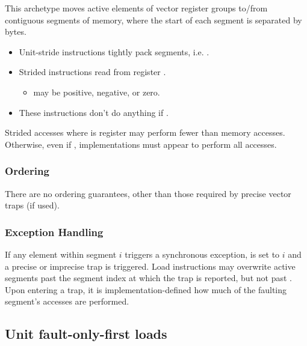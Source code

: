 \noindent
This archetype moves active elements of  vector register groups to/from contiguous segments of memory,
where the start of each segment is separated by  bytes.

\begin{itemize}
    \item Unit-stride instructions tightly pack segments, i.e. .
    \item Strided instructions read  from register .
    \begin{itemize}
        \item {} may be positive, negative, or zero.
    \end{itemize}
    \item These instructions don't do anything if .
\end{itemize}

Strided accesses where  is register  may perform fewer than  memory accesses.
Otherwise, even if , implementations must appear to perform all accesses.

\subsubsection*{Ordering}
There are no ordering guarantees, other than those required by precise vector traps (if used).

\subsubsection*{Exception Handling}
If any element within segment $i$ triggers a synchronous exception,  is set to $i$ and a precise or imprecise trap is triggered.
Load instructions may overwrite active segments past the segment index at which the trap is reported, but not past .\cite[Section~7.7]{specification-RVV-v1.0}
Upon entering a trap, it is implementation-defined how much of the faulting segment's accesses are performed.

\subsection{Unit fault-only-first loads}\label{chap:bg:sec:rvv:fof}

